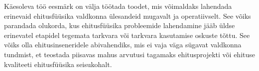 Käesoleva töö eesmärk on välja töötada toodet, mis võimaldaks lahendada erinevaid ehitusfüüsika valdkonna ülesandeid mugavalt 
ja operatiivselt. See võiks parandada olukorda, kus ehitusfüüsika probleemide lahendamine jääb üldse erinevatel etapidel 
tegemata tarkvara või tarkvara kasutamise oskuste tõttu. See võiks olla ehitusinseneridele abivahendiks, mis ei vaja väga sügavat 
valdkonna tundmist, et teostada piisavas mahus arvutusi tagamaks ehitusprojekti või ehituse kvaliteeti ehitusfüüsika seisukohalt.
